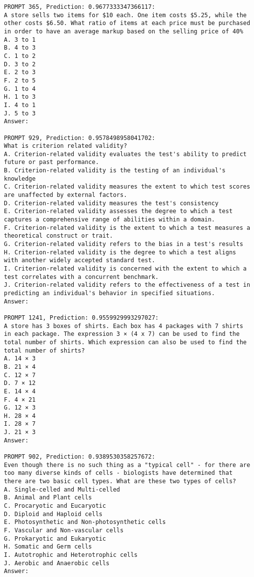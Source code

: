 \documentclass[11pt]{article}
\begin{document}
\begin{figure*}[tb]
    \centering
    \begin{tiny}
\begin{Verbatim}[breaklines=true]
PROMPT 365, Prediction: 0.9677333347366117:
A store sells two items for $10 each. One item costs $5.25, while the other costs $6.50. What ratio of items at each price must be purchased in order to have an average markup based on the selling price of 40%
A. 3 to 1
B. 4 to 3
C. 1 to 2
D. 3 to 2
E. 2 to 3
F. 2 to 5
G. 1 to 4
H. 1 to 3
I. 4 to 1
J. 5 to 3
Answer:

PROMPT 929, Prediction: 0.9578498958041702:
What is criterion related validity?
A. Criterion-related validity evaluates the test's ability to predict future or past performance.
B. Criterion-related validity is the testing of an individual's knowledge
C. Criterion-related validity measures the extent to which test scores are unaffected by external factors.
D. Criterion-related validity measures the test's consistency
E. Criterion-related validity assesses the degree to which a test captures a comprehensive range of abilities within a domain.
F. Criterion-related validity is the extent to which a test measures a theoretical construct or trait.
G. Criterion-related validity refers to the bias in a test's results
H. Criterion-related validity is the degree to which a test aligns with another widely accepted standard test.
I. Criterion-related validity is concerned with the extent to which a test correlates with a concurrent benchmark.
J. Criterion-related validity refers to the effectiveness of a test in predicting an individual's behavior in specified situations.
Answer:

PROMPT 1241, Prediction: 0.9559929993297027:
A store has 3 boxes of shirts. Each box has 4 packages with 7 shirts in each package. The expression 3 × (4 x 7) can be used to find the total number of shirts. Which expression can also be used to find the total number of shirts?
A. 14 × 3
B. 21 × 4
C. 12 × 7
D. 7 × 12
E. 14 × 4
F. 4 × 21
G. 12 × 3
H. 28 × 4
I. 28 × 7
J. 21 × 3
Answer:

PROMPT 902, Prediction: 0.9389530358257672:
Even though there is no such thing as a "typical cell" - for there are too many diverse kinds of cells - biologists have determined that there are two basic cell types. What are these two types of cells?
A. Single-celled and Multi-celled
B. Animal and Plant cells
C. Procaryotic and Eucaryotic
D. Diploid and Haploid cells
E. Photosynthetic and Non-photosynthetic cells
F. Vascular and Non-vascular cells
G. Prokaryotic and Eukaryotic
H. Somatic and Germ cells
I. Autotrophic and Heterotrophic cells
J. Aerobic and Anaerobic cells
Answer:


\end{Verbatim}
\end{tiny}
\end{figure*}
\end{document}
